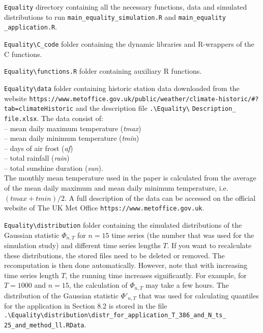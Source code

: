 \documentclass[a4paper,12pt]{article}
\begin{document}
\verb|Equality| \hspace{1pt} directory containing all the necessary functions, data and simulated distributions to run \verb|main_equality_simulation.R| and \verb|main_equality| \linebreak \verb|_application.R|.

\verb|Equality\C_code| \hspace{1pt} folder containing the dynamic libraries and R-wrappers of the C functions.

\verb|Equality\functions.R| \hspace{1pt} folder containing auxiliary R functions.

\verb|Equality\data| \hspace{1pt} folder containing historic station data downloaded from the website
{\verb|https://www.metoffice.gov.uk/public/weather/climate-historic/#?| \linebreak \verb|tab=climateHistoric|
and the description file \verb|.\Equality\| \verb|Description_| \verb|file.xlsx|. The data consist of: \\[0.2cm]
-- mean daily maximum temperature (\textit{tmax}) \\
-- mean daily minimum temperature (\textit{tmin}) \\
-- days of air frost (\textit{af}) \\
-- total rainfall (\textit{rain}) \\
-- total sunshine duration (\textit{sun}). \\[0.2cm]
The monthly mean temperature used in the paper is calculated from the average of the mean daily maximum and mean daily minimum temperature, i.e.\ $(tmax+tmin)/2$. A full description of the data can be accessed on the official website of The UK Met Office \verb|https://www.metoffice.gov.uk|.}

\verb|Equality\distribution| \hspace{1pt} folder containing the simulated distributions of the Gaussian statistic $\Phi_{n, T}$ for $n= 15$ time series (the number that was used for the simulation study) and different time series lengths $T$. If you want to recalculate these distributions, the stored files need to be deleted or removed. The recomputation is then done automatically. However, note that with increasing time series length $T$, the running time increases significantly. For example, for $T = 1000$ and $n = 15$, the calculation of $\Phi_{n, T}$ may take a few hours. The distribution of the Gaussian statistic $\Phi'_{n, T}$ that was used for calculating quantiles for the application in Section 8.2 is stored in the file
\verb|.\Equality\distribution\distr_for_application_T_386_and_N_ts_| \linebreak \verb|25_and_method_ll.RData|. 
\end{document}
